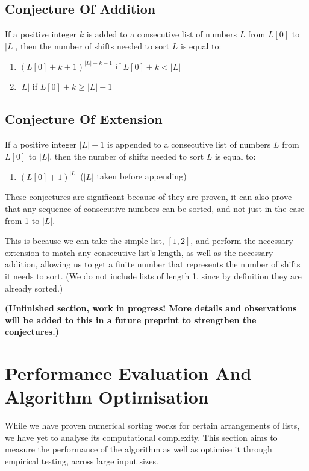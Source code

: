 \documentclass[12pt]{article}
\begin{document}
\subsection{Conjecture Of Addition}

If a positive integer $k$ is added to a consecutive list of numbers $L$ from $L[0]$ to $|L|$, then the number of shifts needed to sort $L$ is equal to:

\begin{enumerate}[start=1]
    \item $(L[0]+k+1)^{|L|-k-1}$ if $L[0]+k<|L|$
    \item $|L|$ if $L[0]+k\geq|L|-1$
\end{enumerate}

\subsection{Conjecture Of Extension}

If a positive integer $|L|+1$ is appended to a consecutive list of numbers $L$ from $L[0]$ to $|L|$, then the number of shifts needed to sort $L$ is equal to:

\begin{enumerate}[start=1]
    \item $(L[0]+1)^{|L|}$ ($|L|$ taken before appending)
\end{enumerate}

These conjectures are significant because of they are proven, it can also prove that any sequence of consecutive numbers can be sorted, and not just in the case from 1 to $|L|$.

This is because we can take the simple list, $[1,2]$, and perform the necessary extension to match any consecutive list's length, as well as the necessary addition, allowing us to get a finite number that represents the number of shifts it needs to sort. (We do not include lists of length 1, since by definition they are already sorted.)

\textbf{(Unfinished section, work in progress! More details and observations will be added to this in a future preprint to strengthen the conjectures.)}

\section{Performance Evaluation And Algorithm Optimisation}
While we have proven numerical sorting works for certain arrangements of lists, we have yet to analyse its computational complexity. This section aims to measure the performance of the algorithm as well as optimise it through empirical testing, across large input sizes.
\end{document}
